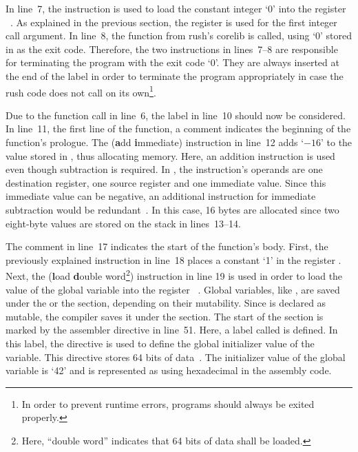 In line~7, the  instruction is used to load the constant integer `0' into the register ~\cite[Reference Card]{Patterson2017}.
As explained in the previous section, the register  is used for the first integer call argument.
In line~8, the  function from rush's corelib is called, using `0' stored in  as the exit code.
Therefore, the two instructions in lines~7--8 are responsible for terminating the program with the exit code `0'.
They are always inserted at the end of the  label in order to terminate the program appropriately in case the rush code does not call  on its own\footnote{In order to prevent runtime errors, programs should always be exited properly.}.

Due to the function call in line~6, the  label in line~10 should now be considered.
In line~11, the first line of the  function, a comment indicates the beginning of the function's prologue.
The  (\textbf{a}dd \textbf{i}mmediate) instruction in line~12 adds `$-16$' to the value stored in , thus allocating memory.
Here, an addition instruction is used even though subtraction is required.
In \riscv{}, the  instruction's operands are one destination register, one source register and one immediate value.
Since this immediate value can be negative, an additional instruction for immediate subtraction would be redundant~\cite[Reference Card]{Patterson2017}.
In this case, 16 bytes are allocated since two eight-byte values are stored on the stack in lines~13--14.


The comment in line~17 indicates the start of the function's body.
First, the previously explained  instruction in line~18 places a constant `1' in the register .
Next, the  (\textbf{l}oad \textbf{d}ouble word\footnote{Here, \enquote{double word} indicates that 64 bits of data shall be loaded.}) instruction in line 19 is used in order to load the value of the global variable  into the register ~\cite[Reference Card]{Patterson2017}.
Global variables, like , are saved under the  or the  section, depending on their mutability.
Since  is declared as mutable, the compiler saves it under the  section.
The start of the  section is marked by the  assembler directive in line~51.
Here, a label called  is defined.
In this label, the  directive is used to define the global initializer value of the variable.
This directive stores 64 bits of data~\cite[p.~39]{Patterson2017}.
The initializer value of the global variable is `42' and is represented as  using hexadecimal in the assembly code.

